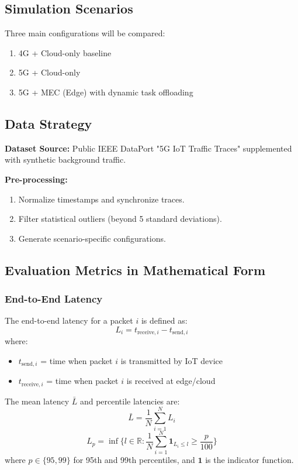 \documentclass[12pt,a4paper]{article}
\begin{document}
\subsection{Simulation Scenarios}
Three main configurations will be compared:
\begin{enumerate}
    \item 4G + Cloud-only baseline
    \item 5G + Cloud-only
    \item 5G + MEC (Edge) with dynamic task offloading
\end{enumerate}

\subsection{Data Strategy}
\textbf{Dataset Source:} Public IEEE DataPort "5G IoT Traffic Traces" supplemented with synthetic background traffic.

\textbf{Pre-processing:}
\begin{enumerate}
    \item Normalize timestamps and synchronize traces.
    \item Filter statistical outliers (beyond 5 standard deviations).
    \item Generate scenario-specific configurations.
\end{enumerate}

\subsection{Evaluation Metrics in Mathematical Form}

\subsubsection{End-to-End Latency}
The end-to-end latency for a packet \(i\) is defined as:
\[
L_i = t_{\text{receive},i} - t_{\text{send},i}
\]
where:
\begin{itemize}
    \item \(t_{\text{send},i}\) = time when packet \(i\) is transmitted by IoT device
    \item \(t_{\text{receive},i}\) = time when packet \(i\) is received at edge/cloud
\end{itemize}

The mean latency \(\bar{L}\) and percentile latencies are:
\[
\bar{L} = \frac{1}{N}\sum_{i=1}^{N} L_i
\]
\[
L_{p} = \inf \{ l \in \mathbb{R} : \frac{1}{N}\sum_{i=1}^{N} \mathbf{1}_{L_i \leq l} \geq \frac{p}{100} \}
\]
where \(p \in \{95, 99\}\) for 95th and 99th percentiles, and \(\mathbf{1}\) is the indicator function.
\end{document}
